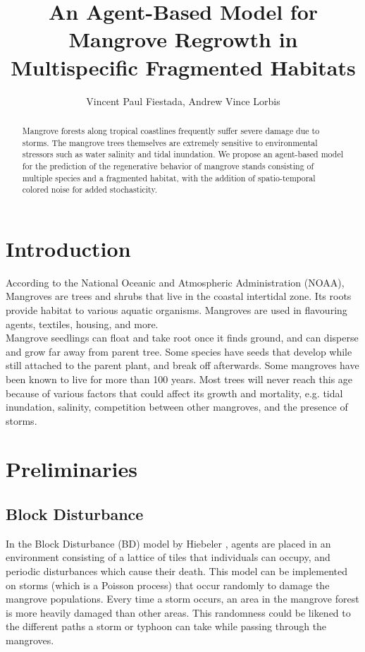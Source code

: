 \documentclass[14pt,letterpaper]{article}
\title{An Agent-Based Model for Mangrove Regrowth in Multispecific Fragmented Habitats}
\author{Vincent Paul Fiestada, Andrew Vince Lorbis}
\begin{document}
\prefacepages

\begin{abstract}
Mangrove forests along tropical coastlines frequently suffer severe damage due to storms. The mangrove trees themselves are extremely sensitive to environmental stressors such as water salinity and tidal inundation. We propose an agent-based model for the prediction of the regenerative behavior of mangrove stands consisting of multiple species and a fragmented habitat, with the addition of spatio-temporal colored noise for added stochasticity. 
\end{abstract}

\afterpreface

\section{Introduction}
According to the National Oceanic and Atmospheric Administration (NOAA), Mangroves are trees and shrubs that live in the coastal intertidal zone. Its roots provide habitat to various aquatic organisms. Mangroves are used in flavouring agents, textiles, housing, and more.\\ 
Mangrove seedlings can float and take root once it finds ground, and can disperse and grow far away from parent tree. Some species have seeds that develop while still attached to the parent plant, and break off afterwards.
Some mangroves have been known to live for more than 100 years. Most trees will never reach this age because of various factors that could affect its growth and mortality, e.g. tidal inundation, salinity, competition between other mangroves, and the presence of storms.
\section{Preliminaries}
\subsection{Block Disturbance}
In the Block Disturbance (BD) model by Hiebeler \cite{hiebelerdisturbance}, agents are placed in an environment consisting of a lattice of tiles that individuals can occupy, and periodic disturbances which cause their death. This model can be implemented on storms (which is a Poisson process) that occur randomly to damage the mangrove populations. Every time a storm occurs, an area in 
the mangrove forest is more heavily damaged than other areas. This randomness could be likened
to the different paths a storm or typhoon can take while passing through the mangroves.
\end{document}
